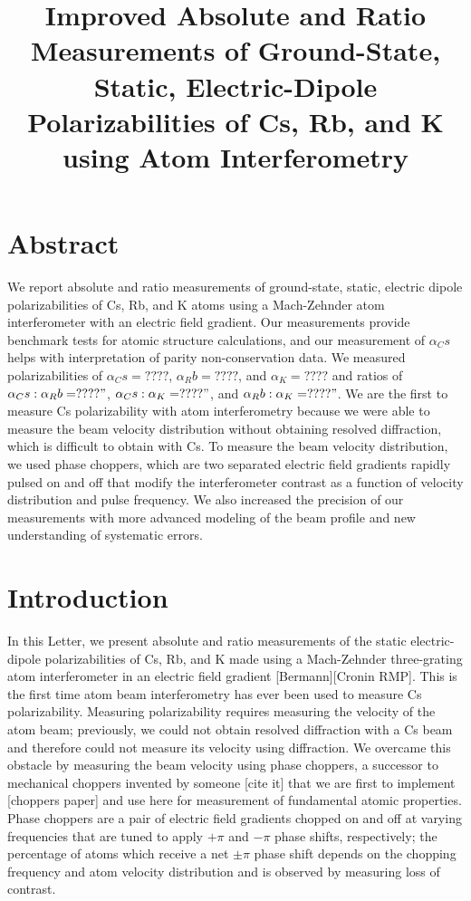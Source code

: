 \documentclass[12pt,letterpaper]{article}
\title{Improved Absolute and Ratio Measurements of Ground-State, Static, Electric-Dipole Polarizabilities of Cs, Rb, and K using Atom Interferometry}
\date{}
\author{}
\begin{document}
\maketitle

\section{Abstract}

We report absolute and ratio measurements of ground-state, static, electric dipole polarizabilities of Cs, Rb, and K atoms using a Mach-Zehnder atom interferometer with an electric field gradient. Our measurements provide benchmark tests for atomic structure calculations, and our measurement of $\alpha_Cs$ helps with interpretation of parity non-conservation data. We measured polarizabilities of $\alpha_Cs = ????$, $\alpha_Rb = ????$, and $\alpha_K = ????$ and ratios of $\alpha_Cs:\alpha_Rb = ????"$, $\alpha_Cs:\alpha_K = ????"$, and $\alpha_Rb:\alpha_K = ????"$. We are the first to measure Cs polarizability with atom interferometry because we were able to measure the beam velocity distribution without obtaining resolved diffraction, which is difficult to obtain with Cs. To measure the beam velocity distribution, we used phase choppers, which are two separated electric field gradients rapidly pulsed on and off that modify the interferometer contrast as a function of velocity distribution and pulse frequency. We also increased the precision of our measurements with more advanced modeling of the beam profile and new understanding of systematic errors.

\section{Introduction}

In this Letter, we present absolute and ratio measurements of the static electric-dipole polarizabilities of Cs, Rb, and K made using a Mach-Zehnder three-grating atom interferometer in an electric field gradient [Bermann][Cronin RMP]. This is the first time atom beam interferometry has ever been used to measure Cs polarizability. Measuring polarizability requires measuring the velocity of the atom beam; previously, we could not obtain resolved diffraction with a Cs beam and therefore could not measure its velocity using diffraction. We overcame this obstacle by measuring the beam velocity using phase choppers, a successor to mechanical choppers invented by someone [cite it] that we are first to implement [choppers paper] and use here for measurement of fundamental atomic properties. Phase choppers are a pair of electric field gradients chopped on and off at varying frequencies that are tuned to apply $+\pi$ and $-\pi$ phase shifts, respectively; the percentage of atoms which receive a net $\pm\pi$ phase shift depends on the chopping frequency and atom velocity distribution and is observed by measuring loss of contrast. 
\end{document}
